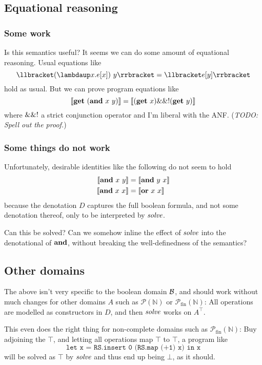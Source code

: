\documentclass[manuscript,screen,acmsmall,nonacm]{acmart}
\begin{document}
\subsection{Equational reasoning}

\subsubsection{Some work}

Is this semantics useful? It seems we can do some amount of equational reasoning. Usual equations like
\[
\D{(\slambda x. e[x])~y} = \D{e[y]}
\]
hold as usual. But we can prove program equations like
\[
\llbracket \mathbf{get}~(\mathbf{and}~x~y) \rrbracket = \llbracket (\mathbf{get}~x) \mathbf{\&\&!} (\mathbf{get}~y) \rrbracket
\]
where $\mathbf{\&\&!}$ a strict conjunction operator and I’m liberal with the ANF. (\emph{TODO: Spell out the proof.})

\subsubsection{Some things do not work}

Unfortunately, desirable identities like the following do not seem to hold
\begin{align*}
\llbracket \mathbf{and}~x~y \rrbracket &= \llbracket \mathbf{and}~y~x \rrbracket \\
\llbracket \mathbf{and}~x~x \rrbracket &= \llbracket \mathbf{or}~x~x \rrbracket
\end{align*}
because the denotation $D$ captures the full boolean formula, and not some denotation thereof, only to be interpreted by $\operatorname{\textit{solve}}$.

Can this be solved? Can we somehow inline the effect of $\operatorname{\textit{solve}}$ into the denotational of $\mathbf{and}$, without breaking the well-definedness of the semantics?

\subsection{Other domains}

The above isn’t very specific to the boolean domain $\mathcal B$, and should work without much changes for other domains $A$ such as $\mathcal P(\mathbb N)$ or $\mathcal P_{\text{fin}}(\mathbb N)$: All operations are modelled as constructors in $D$, and then $\operatorname{\textit{solve}}$ works on $A^\top$.

This even does the right thing for non-complete domains such as $\mathcal P_{\text{fin}}(\mathbb N)$: Buy adjoining the $\top$, and letting all operations map $\top$ to $\top$, a program like
\[
\texttt{let x = RS.insert 0 (RS.map (+1) x) in x}
\]
will be solved as $\top$ by $\operatorname{\textit{solve}}$ and thus end up being $\bot$, as it should.
\end{document}
